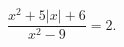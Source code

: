 \begin{ex}[type=equation]
	\begin{condition}
		$\dfrac{x^2 + 5\big|x\big| + 6}{x^2 - 9} = 2.$
	\end{condition}
\end{ex}